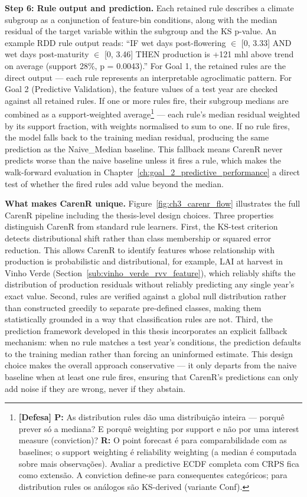 \textbf{Step 6: Rule output and prediction. }Each retained rule describes a climate subgroup as a conjunction of feature-bin conditions, along with the median residual of the target variable within the subgroup and the KS p-value. An example RDD rule output reads: ``IF wet days post-flowering $\in$ [0, 3.33] AND wet days post-maturity $\in$ [0, 3.46] THEN production is +121 mhl above trend on average (support 28\%, p = 0.0043).'' For Goal 1, the retained rules are the direct output --- each rule represents an interpretable agroclimatic pattern. For Goal 2 (Predictive Validation), the feature values of a test year are checked against all retained rules. If one or more rules fire, their subgroup medians are combined as a support-weighted average\footnote{\textbf{[Defesa] P:} As distribution rules dão uma distribuição inteira --- porquê prever só a mediana? E porquê weighting por support e não por uma interest measure (conviction)? \textbf{R:} O point forecast é para comparabilidade com as baselines; o support weighting é reliability weighting (a median é computada sobre mais observações). Avaliar a predictive ECDF completa com CRPS fica como extensão. A conviction define-se para consequentes categóricos; para distribution rules os análogos são KS-derived (variante Conf).} --- each rule's median residual weighted by its support fraction, with weights normalised to sum to one. If no rule fires, the model falls back to the training median residual, producing the same prediction as the Naive\_Median baseline. This fallback means CarenR never predicts worse than the naive baseline unless it fires a rule, which makes the walk-forward evaluation in Chapter~\ref{ch:goal_2_predictive_performance} a direct test of whether the fired rules add value beyond the median.

\textbf{What makes CarenR unique. }Figure~\ref{fig:ch3_carenr_flow} illustrates the full CarenR pipeline including the thesis-level design choices. Three properties distinguish CarenR from standard rule learners. First, the KS-test criterion detects distributional shift rather than class membership or squared error reduction. This allows CarenR to identify features whose relationship with production is probabilistic and distributional, for example, LAI at harvest in Vinho Verde (Section~\ref{sub:vinho_verde_rvv_feature}), which reliably shifts the distribution of production residuals without reliably predicting any single year's exact value. Second, rules are verified against a global null distribution rather than constructed greedily to separate pre-defined classes, making them statistically grounded in a way that classification rules are not. Third, the prediction framework developed in this thesis incorporates an explicit fallback mechanism: when no rule matches a test year's conditions, the prediction defaults to the training median rather than forcing an uninformed estimate. This design choice makes the overall approach conservative --- it only departs from the naive baseline when at least one rule fires, ensuring that CarenR's predictions can only add noise if they are wrong, never if they abstain.


